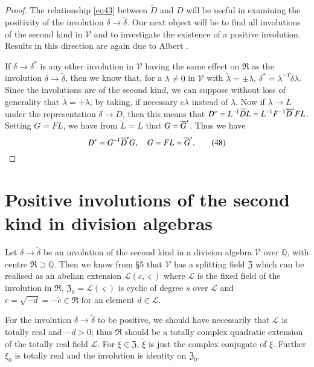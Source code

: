 \begin{proof}
The relationship \eqref{eq43} between $\widetilde{D}$ and $D$ will be useful
in examining the positivity of the involution $\delta \rightarrow
\widetilde{\delta}$. Our next object will be to find all involutions
of the second kind in $\mathscr{V}$ and to investigate the existence
of a positive involution. Results in this direction are again due to
Albert \cite{1}.

If $\delta \rightarrow \delta^{\ast}$ is any other involution in
$\mathscr{V}$ having the same effect on $\mathfrak{R}$ as the
involution $\delta \rightarrow \widetilde{\delta}$, then we know that,
for a \; $\lambda \neq 0$ in $\mathscr{V}$ with $\widetilde{\lambda}=\pm
\lambda$, $\delta^{\ast} = \lambda^{-1}
\widetilde{\delta}\lambda$. Since the involutions are of
\pageoriginale the second kind, we can suppose without loss of
generality that $\widetilde{\lambda}= + \lambda$, by taking, if
necessary $c\lambda$ instead of $\lambda$. Now if $\lambda \rightarrow
L$ under the representation $\delta \rightarrow D$, then this means
that $D^{\ast}=L^{-1} \widetilde{D}L= L^{-1} F^{-1} \overline{D}' F
L$. Setting $G=FL$, we have from $\widetilde{L}=L$ that
$G=\overline{G}'$. Thus we have
\begin{equation*}
D^{\ast} = G^{-1} \overline{D}' G, \quad G = FL = \overline{G}'. \tag{48}\label{eq48}
\end{equation*}
\end{proof}

\section{Positive involutions of the second kind in division algebras}

Let $\delta \rightarrow \widetilde{\delta}$ be an involution of the
second kind in a division algebra $\mathscr{V}$ over $\mathbb{Q}$,
with centre $\mathfrak{R} \supset\mathbb{Q}$. Then we know
from \S 5 that $\mathscr{V}$ has a splitting field $\mathfrak{Z}$
which can be realised as an abelian extension
$\mathscr{L}(c,\varsigma)$ where $\mathscr{L}$ is the fixed field of
the involution in $\mathfrak{R}$, $\mathfrak{Z}_0 =
\mathscr{L}(\varsigma)$ is cyclic of degree $s$ over $\mathscr{L}$ and
$c=\sqrt{-d}=-\widetilde{c} \in \mathfrak{R}$ for an element $d\in
\mathscr{L}$. 

For the involution $\delta \rightarrow \widetilde{\delta}$ to be
positive, we should have necessarily that $\mathscr{L}$ is totally
real and $-d>0$; thus $\mathfrak{R}$ should be a totally complex
quadratic extension of the totally real field $\mathscr{L}$. For
$\xi\in \mathfrak{Z}$, $\widetilde{\xi}$ is just the complex conjugate
of $\xi$. Further $\mathfrak{\xi}_0$ is totally real and the
involution is identity on $\mathfrak{Z}_0$.


